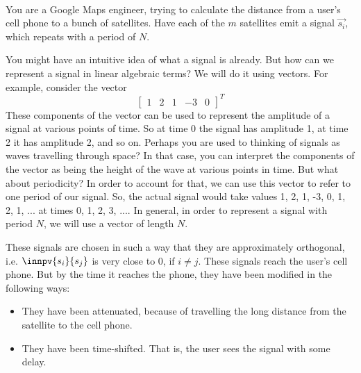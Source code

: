 

\\
You are a Google Maps engineer, trying to calculate the distance from a user's cell phone to a bunch of satellites. Have each of the $m$ satellites emit a signal $\vec{s_i}$, which repeats with a period of $N$. 

You might have an intuitive idea of what a signal is already. But how can we represent a signal in linear algebraic terms? We will do it using vectors. For example, consider the vector
$$\begin{bmatrix} 1 & 2 & 1 & -3 & 0\end{bmatrix}^T$$
These components of the vector can be used to represent the amplitude of a signal at various points of time. So at time 0 the signal has amplitude 1, at time 2 it has amplitude 2, and so on. Perhaps you are used to thinking of signals as waves travelling through space? In that case, you can interpret the components of the vector as being the height of the wave at various points in time. But what about periodicity? In order to account for that, we can use this vector to refer to one period of our signal. So, the actual signal would take values 1, 2, 1, -3, 0, 1, 2, 1, ... at times 0, 1, 2, 3, ....
In general, in order to represent a signal with period $N$, we will use a vector of length $N$.


These signals are chosen in such a way that they are approximately orthogonal, i.e. $\innpv{s_i}{s_j}$ is very close to 0, if $i \neq j$. These signals reach the user's cell phone. But by the time it reaches the phone, they have been modified in the following ways:

\begin{itemize}
    \item They have been attenuated, because of travelling the long distance from the satellite to the cell phone.
    \item They have been time-shifted. That is, the user sees the signal with some delay.
\end{itemize}


